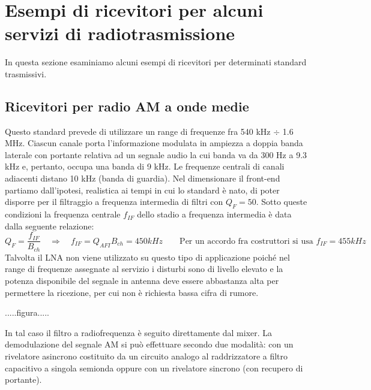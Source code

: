 

\section{Esempi di ricevitori per alcuni servizi di radiotrasmissione}
In questa sezione esaminiamo alcuni esempi di ricevitori per determinati standard trasmissivi.

\subsection{Ricevitori per radio AM a onde medie}
Questo standard prevede di utilizzare un range di frequenze fra 540 kHz $\div$ 1.6 MHz. Ciascun canale porta l'informazione modulata in ampiezza a doppia banda laterale con portante relativa ad un segnale audio la cui banda va da 300 Hz a 9.3 kHz e, pertanto, occupa una banda di 9 kHz. Le
frequenze centrali di canali adiacenti distano 10 kHz (banda di guardia).
Nel dimensionare il front-end partiamo dall'ipotesi, realistica ai tempi in cui lo standard è nato, di poter disporre per il filtraggio a frequenza intermedia di filtri con $Q_F = 50$. Sotto queste condizioni la frequenza centrale $f_{IF}$ dello stadio a frequenza intermedia è data dalla seguente relazione:
\[
Q_F = \frac{f_{IF}}{B_{ch}}
\quad\Rightarrow\quad
f_{IF} = Q_{AFI}  B_{ch} = 450 kHz
\qquad
\mbox{Per un accordo fra costruttori si usa $f_{IF}= 455kHz$}
\]
Talvolta il LNA non viene utilizzato su questo tipo di applicazione poiché nel range di frequenze assegnate al servizio i disturbi sono di livello elevato e la potenza disponibile del segnale in antenna deve essere abbastanza alta per permettere la ricezione, per cui non è richiesta bassa cifra di rumore.

.....figura.....

In tal caso il filtro a radiofrequenza è seguito direttamente dal mixer. La demodulazione del segnale AM si può effettuare secondo due modalità: con un rivelatore asincrono costituito da un circuito analogo al raddrizzatore a filtro capacitivo a singola semionda oppure con un rivelatore sincrono (con recupero di portante).

